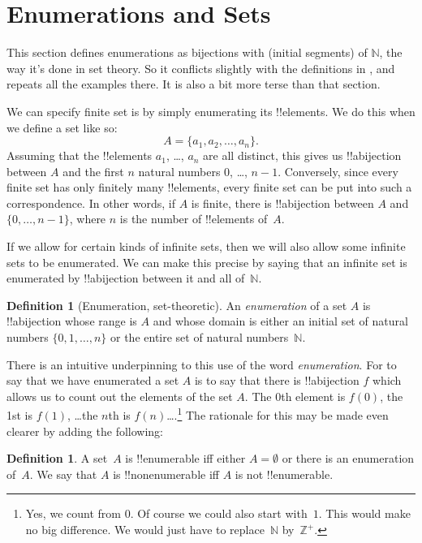 \documentclass[10pt,a4paper]{article}
\makeatletter
\theoremstyle{plain}
\theoremstyle{definition}
\newtheorem{defn}[thm]{Definition}
\theoremstyle{remark}
\newenvironment{explain}{}{}
\newenvironment{editorial}{}{}
\newcommand*{\olfileid}[3]{}
\newcommand*{\olsection}[1]{\section*{#1}}
\newcommand*{\ollabel}[1]{\label{#1}}
\newcommand{\olref}{\@ifnextchar[{\olref@i}{\olref@final}}
\def\olref@i[#1]{\@ifnextchar[{\olref@ii}{\olref@final}}
\def\olref@ii[#1]{\@ifnextchar[{\olref@iii}{\olref@final}}
\def\olref@iii[#1]{\olref@final}
\def\olref@final#1{\ref{#1}}
\providecommand{\Nat}{\ensuremath{\mathbb{N}}}
\providecommand{\PosInt}{\mathbb{Z}^{+}}
\makeatother
\begin{document}
\olfileid{sfr}{siz}{enm-alt}

\olsection{Enumerations and  Sets}

\begin{editorial}
  This section defines enumerations as bijections with (initial
  segments) of $\Nat$, the way it's done in set theory. So it
  conflicts slightly with the definitions in \olref[enm]{sec}, and
  repeats all the examples there. It is also a bit more terse than
  that section.
\end{editorial}

We can specify finite set is by simply enumerating its
!!{element}s. We do this when we define a set like so:
\[
  A = \{a_1, a_2, \ldots, a_n\}.
\]
Assuming that the !!{element}s $a_1$, \dots, $a_n$ are all distinct,
this gives us !!a{bijection} between $A$ and the first $n$ natural
numbers $0$, \dots, $n-1$. Conversely, since every finite set has only
finitely many !!{element}s, every finite set can be put into such a
correspondence. In other words, if $A$ is finite, there is
!!a{bijection} between $A$ and $\{0, \dots, n-1\}$, where $n$ is the
number of !!{element}s of~$A$.

If we allow for certain kinds of infinite sets, then we will also
allow some infinite sets to be enumerated. We can make this precise by
saying that an infinite set is enumerated by !!a{bijection} between it
and all of~$\Nat$.

\begin{defn}[Enumeration, set-theoretic] 
An \emph{enumeration} of a set $A$ is !!a{bijection} whose range is
$A$ and whose domain is either an initial set of natural numbers $\{0,
1, \ldots, n\}$ {or} the entire set of natural numbers~$\Nat$. 
\end{defn}

\begin{explain}
There is an intuitive underpinning to this use of the word
\emph{enumeration}. For to say that we have enumerated a set $A$ is to
say that there is !!a{bijection} $f$ which allows us to count out the
elements of the set $A$. The $0$th element is $f(0)$, the 1st is
$f(1)$, \ldots the $n$th is $f(n)$\ldots.\footnote{Yes, we count
from $0$. Of course we could also start with~$1$. This would
make no big difference. We would just have to replace~$\Nat$
by~$\PosInt$.} The rationale for this may be made even clearer by
adding the following:
\end{explain}

\begin{defn}
  \ollabel{defn:enumerable}
  A set~$A$ is !!{enumerable} iff either $A = \emptyset$ or there is
  an enumeration of~$A$. We say that $A$ is !!{nonenumerable} iff $A$
  is not !!{enumerable}.
\end{defn}
\end{document}
